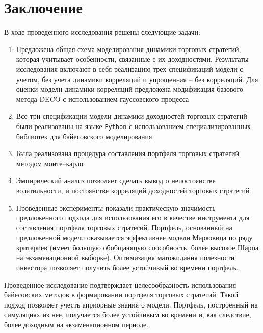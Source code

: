 \chapter*{Заключение}

В ходе проведенного исследования решены следующие задачи:
\begin{enumerate}
	\item Предложена общая схема моделирования динамики торговых стратегий, которая учитывает особенности, связанные с их доходностями. Результаты исследования включают в себя реализацию трех спецификаций модели с учетом, без учета динамики корреляций и упрощенная -- без корреляций. Для оценки модели динамики корреляций предложена модификация базового метода DECO с использованием гауссовского процесса

	\item Все три спецификации модели динамики доходностей торговых стратегий были реализованы на языке \texttt{Python} с использованием специализированных библиотек для байесовского моделирования
	
	\item Была реализована процедура составления портфеля торговых стратегий методом монте--карло

	\item Эмпирический анализ позволяет сделать вывод о непостоянстве волатильности, и постоянстве корреляций доходностей торговых стратегий

	\item Проведенные эксперименты показали практическую значимость предложенного подхода для использования его в качестве инструмента для составления портфеля торговых стратегий.
	Портфель, основанный на предложенной модели оказывается эффективнее модели Марковица по ряду критериев (имеет большую обобщающую способность, более высокое Шарпа на экзаменационной выборке). Оптимизация матожидания полезности инвестора позволяет получить более устойчивый во времени портфель.

\end{enumerate}

Проведенное исследование подтверждает целесообразность использования байесовских методов в формировании портфеля торговых стратегий. Такой подход позволяет учесть априорные знания о модели. Портфель, построенный на симуляциях из нее, получается более устойчивым во времени и, как следствие, более доходным на экзаменационном периоде.

